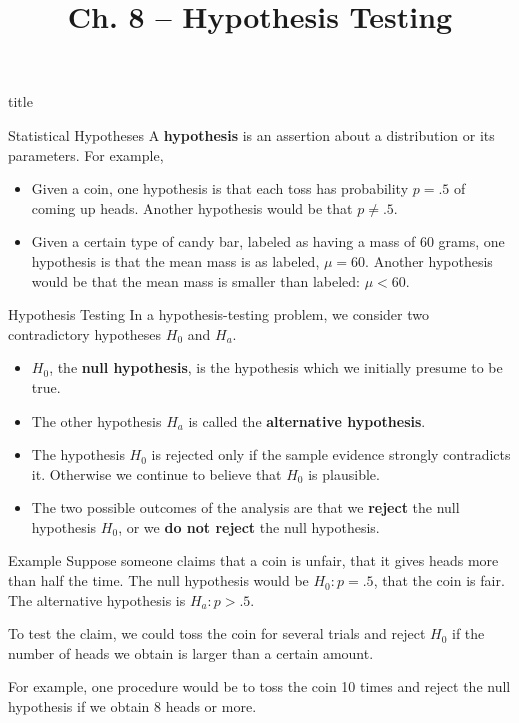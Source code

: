 \documentclass{beamer}
\title{Ch. 8 -- Hypothesis Testing}
\renewcommand{\emph}{\textbf}
\begin{document}
\begin{frame}
\begin{beamercolorbox}[rounded=true,wd=\textwidth,center]{title}
\inserttitle
\end{beamercolorbox}
\end{frame} 

\begin{frame}{Statistical Hypotheses}
A \emph{hypothesis} is an assertion about a distribution or its parameters. \pause For example,
\begin{itemize}
\item Given a coin, one hypothesis is that each toss has probability $p=.5$ of coming up heads. \pause Another hypothesis would be that $p\neq .5$.
\pause \item Given a certain type of candy bar, labeled as having a mass of 60 grams, one hypothesis is that the mean mass is as labeled, $\mu=60$. \pause Another hypothesis would be that the mean mass is smaller than labeled: $\mu<60$.
\end{itemize}
\end{frame}

\begin{frame}{Hypothesis Testing}
In a hypothesis-testing problem, we consider two contradictory hypotheses $H_0$ and $H_a$.
\begin{itemize}
\pause \item $H_0$, the \emph{null hypothesis}, is the hypothesis which we initially presume to be true.
\pause \item The other hypothesis $H_a$ is called the \emph{alternative hypothesis}.
\pause \item The hypothesis $H_0$ is rejected only if the sample evidence strongly contradicts it. Otherwise we continue to believe that $H_0$ is plausible.
\pause \item The two possible outcomes of the analysis are that we \emph{reject} the null hypothesis $H_0$, or we \emph{do not reject} the null hypothesis.
\end{itemize}
\end{frame}

\begin{frame}{Example}
Suppose someone claims that a coin is unfair, that it gives heads more than half the time. \pause The null hypothesis would be $H_0: p=.5$, that the coin is fair. \pause The alternative hypothesis is $H_a: p>.5$.

\vspace{.2cm}
\pause To test the claim, we could toss the coin for several trials and reject $H_0$ if the number of heads we obtain is larger than a certain amount. 

\vspace{.2cm}
\pause For example, one procedure would be to toss the coin 10 times and reject the null hypothesis if we obtain 8 heads or more.
\end{frame}
\end{document}
